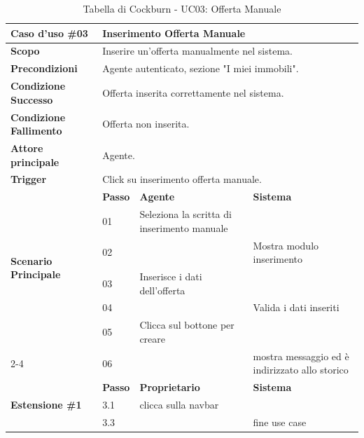 \documentclass{article}
\begin{document}
\begin{table}[H]
\centering
\renewcommand{\arraystretch}{1.5}
\begin{tabular}{|p{3cm}|l|p{4.5cm}|p{4.5cm}|}
\hline
\rowcolor[HTML]{010066} 
{\color[HTML]{EFEFEF} \textbf{Caso d'uso \#03}} & \multicolumn{3}{l|}{\color[HTML]{FFFFFF} \textbf{Inserimento Offerta Manuale}} \\ \hline

\textbf{Scopo} & \multicolumn{3}{l|}{Inserire un'offerta manualmente nel sistema.} \\ \hline

\textbf{Precondizioni} & \multicolumn{3}{l|}{Agente autenticato, sezione "I miei immobili".} \\ \hline

\textbf{Condizione Successo} & \multicolumn{3}{l|}{Offerta inserita correttamente nel sistema.} \\ \hline

\textbf{Condizione Fallimento} & \multicolumn{3}{l|}{Offerta non inserita.} \\ \hline

\textbf{Attore principale} & \multicolumn{3}{l|}{Agente.} \\ \hline

\textbf{Trigger} & \multicolumn{3}{l|}{Click su inserimento offerta manuale.} \\ \hline

\hline
\multirow{6}{3cm}{\textbf{Scenario Principale}} 
   & \textbf{Passo} & \textbf{Agente} & \textbf{Sistema} \\ \cline{2-4}
   & 01 & Seleziona la scritta di inserimento manuale & \\ \cline{2-4}
   & 02 & & Mostra modulo inserimento \\ \cline{2-4}
   & 03 & Inserisce i dati dell'offerta & \\ \cline{2-4}
   & 04 & & Valida i dati inseriti \\ \cline{2-4}
   & 05 & Clicca sul bottone per creare & \\ \cline{2-4}
   & 06 & & mostra messaggio ed è indirizzato allo storico \\ \hline

\hline
\multirow{3}{3cm}{\textbf{Estensione \#1}} 
   & \textbf{Passo} & \textbf{Proprietario} & \textbf{Sistema} \\ \cline{2-4}
   & 3.1 & clicca sulla navbar & \\ \cline{2-4}
   & 3.3 & & fine use case \\ \hline

\end{tabular}
\caption{Tabella di Cockburn - UC03: Offerta Manuale}
\end{table}
\end{document}
